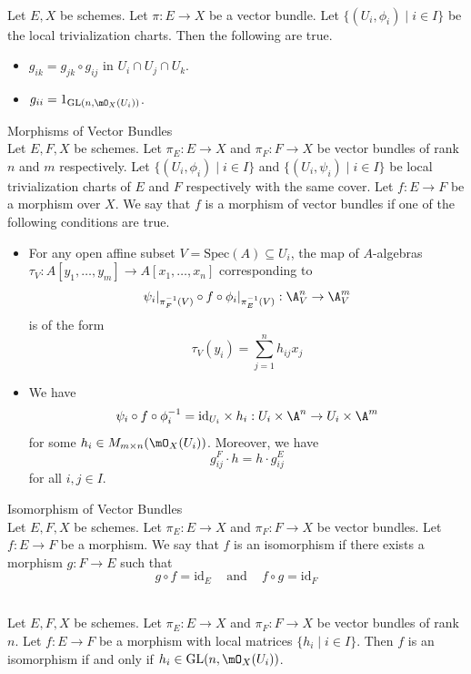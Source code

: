 \documentclass[a4paper]{article}
\begin{document}
\begin{lmm}{}{}\\
Let $E,X$ be schemes. Let $\pi:E\to X$ be a vector bundle. Let $\{(U_i,\phi_i)\;|\;i\in I\}$ be the local trivialization charts. Then the following are true. 
\begin{itemize}
\item $g_{ik}=g_{jk}\circ g_{ij}$ in $U_i\cap U_j\cap U_k$. 
\item $g_{ii}=1_{\text{GL}(n,\mO_X(U_i))}$. 
\end{itemize}
\end{lmm}

\begin{defn}{Morphisms of Vector Bundles}{}\\
Let $E,F,X$ be schemes. Let $\pi_E:E\to X$ and $\pi_F:F\to X$ be vector bundles of rank $n$ and $m$ respectively. Let $\{(U_i,\phi_i)\;|\;i\in I\}$ and $\{(U_i,\psi_i)\;|\;i\in I\}$ be local trivialization charts of $E$ and $F$ respectively with the same cover. Let $f:E\to F$ be a morphism over $X$. We say that $f$ is a morphism of vector bundles if one of the following conditions are true. 
\begin{itemize}
\item For any open affine subset $V=\text{Spec}(A)\subseteq U_i$, the map of $A$-algebras $\tau_V:A[y_1,\dots,y_m]\to A[x_1,\dots,x_n]$ corresponding to $$\psi_i|_{\pi_F^{-1}(V)}\circ f\circ \phi_i|_{\pi_E^{-1}(V)}:\A_V^n\to\A_V^m$$ is of the form $$\tau_V(y_i)=\sum_{j=1}^nh_{ij}x_j$$
\item We have $$\psi_i\circ f\circ\phi_i^{-1}=\text{id}_{U_i}\times h_i:U_i\times\A^n\to U_i\times\A^m$$ for some $h_i\in M_{m\times n}(\mO_X(U_i))$. Moreover, we have $$g_{ij}^F\cdot h=h\cdot g_{ij}^E$$ for all $i,j\in I$. 
\end{itemize}
\end{defn}

\begin{defn}{Isomorphism of Vector Bundles}{}\\
Let $E,F,X$ be schemes. Let $\pi_E:E\to X$ and $\pi_F:F\to X$ be vector bundles. Let $f:E\to F$ be a morphism. We say that $f$ is an isomorphism if there exists a morphism $g:F\to E$ such that $$g\circ f=\text{id}_E\;\;\;\text{ and }\;\;\;f\circ g=\text{id}_F$$
\end{defn}

\begin{prp}{}{}\\
Let $E,F,X$ be schemes. Let $\pi_E:E\to X$ and $\pi_F:F\to X$ be vector bundles of rank $n$. Let $f:E\to F$ be a morphism with local matrices $\{h_i\;|\;i\in I\}$. Then $f$ is an isomorphism if and only if $h_i\in\text{GL}(n,\mO_X(U_i))$. 
\end{prp}
\end{document}
